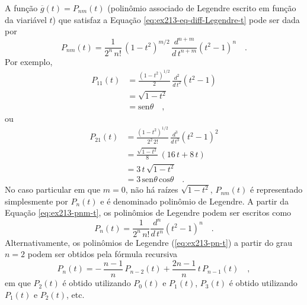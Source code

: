 \documentclass[10pt,a4paper,fleqn]{article}
\begin{document}
A fun\c{c}\~{a}o $\overline{g}(t) = P_{nm}(t)$ (polin\^{o}mio associado de Legendre escrito em fun\c{c}\~{a}o da viari\'{a}vel 
$t$) que satisfaz a Equa\c{c}\~{a}o \ref{eq:ex213-eq-diff-Legendre-t} pode ser dada por
\begin{equation}
P_{nm}(t) = \frac{1}{2^{n} \, n!} \, (1 - t^{2})^{m/2} \,
\frac{d^{n+m}}{d \, t^{n+m}}(t^{2} - 1)^{n} \quad .
\label{eq:ex213-pnm-t}
\end{equation}
Por exemplo,
\begin{equation}
\begin{split}
P_{11}(t) & = \frac{(1 - t^{2})^{1/2}}{2} \, \frac{d^{2}}{d \, t^{2}}(t^{2} - 1) \\
& = \sqrt{1 - t^{2}} \\
& = \text{sen} \theta \quad ,
\end{split}
\label{eq:ex213-p11-t}
\end{equation}
ou
\begin{equation}
\begin{split}
P_{21}(t) & = \frac{(1 - t^{2})^{1/2}}{2^{2} \, 2!} \, \frac{d^{3}}{d \, t^{3}}(t^{2} - 1)^{2} \\
& = \frac{\sqrt{1 - t^{2}}}{8} \, (16 \, t + 8 \, t) \\
& = 3 \, t \, \sqrt{1 - t^{2}} \\
& = 3 \, \text{sen} \theta \, \text{cos} \theta \quad .
\end{split}
\label{eq:ex213-p21-t}
\end{equation}
No caso particular em que $m = 0$, n\~{a}o h\'{a} ra\'{i}zes $\sqrt{1 - t^{2}}$, $P_{nm}(t)$ \'{e} representado 
simplesmente por $P_{n}(t)$ e \'{e} denominado polin\^{o}mio de Legendre. A partir da Equa\c{c}ão \ref{eq:ex213-pnm-t}, 
os polin\^{o}mios de Legendre podem ser escritos como
\begin{equation}
P_{n}(t) = \frac{1}{2^{n} \, n!} \frac{d^{n}}{d \, t^{n}}(t^{2} - 1)^{n} \quad .
\label{eq:ex213-pn-t}
\end{equation}
Alternativamente, os polin\^{o}mios de Legendre (\ref{eq:ex213-pn-t}) a partir do grau $n = 2$ podem ser obtidos pela 
f\'{o}rmula recursiva
\begin{equation}
P_{n}(t) = - \, \frac{n - 1}{n} \, P_{n-2}(t) + \frac{2n - 1}{n} \, t \, P_{n-1}(t) \quad ,
\label{eq:ex213-pn-recursiva}
\end{equation}
em que $P_{2}(t)$ \'{e} obtido utilizando $P_{0}(t)$ e $P_{1}(t)$, $P_{3}(t)$ \'{e} obtido utilizando $P_{1}(t)$ e $P_{2}(t)$, etc.

\begin{flushleft}
\dotfill
\end{flushleft}
\end{document}
